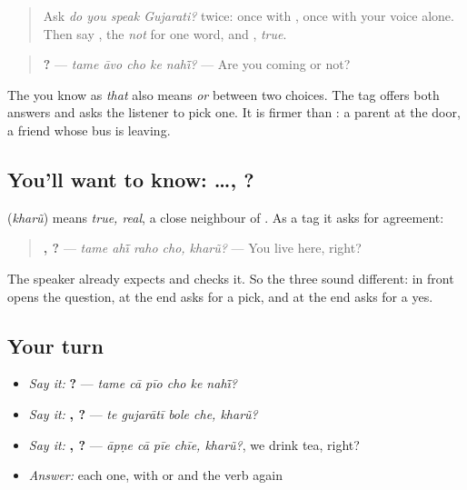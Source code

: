 \begin{quote}
Ask \emph{do you speak Gujarati?} twice: once with \textbf{}, once with your voice alone. Then say \textbf{}, the \emph{not} for one word, and \textbf{}, \emph{true}.
\end{quote}

\begin{grammarlens}[title={Grammar Lens: … \gu{કે} \gu{નહીં}?}]
\begin{quote}
\textbf{    ?} — \emph{tame āvo cho ke nahī̃?} — Are you coming or not?
\end{quote}

The \textbf{} you know as \emph{that} also means \emph{or} between two choices. The tag offers both answers and asks the listener to pick one. It is firmer than \textbf{}: a parent at the door, a friend whose bus is leaving.
\end{grammarlens}

\subsection*{You'll want to know: …, ?}
\textbf{} (\emph{kharũ}) means \emph{true, real}, a close neighbour of \textbf{}. As a tag it asks for agreement:

\begin{quote}
\textbf{   , ?} — \emph{tame ahī̃ raho cho, kharũ?} — You live here, right?
\end{quote}

The speaker already expects \textbf{} and checks it. So the three sound different: \textbf{} in front opens the question, \textbf{ } at the end asks for a pick, and \textbf{} at the end asks for a yes.

\subsection*{Your turn}
\begin{itemize}
\raggedright
  \item \emph{Say it:} \textbf{     ?} — \emph{tame cā pīo cho ke nahī̃?}
  \item \emph{Say it:} \textbf{   , ?} — \emph{te gujarātī bole che, kharũ?}
  \item \emph{Say it:} \textbf{   , ?} — \emph{āpṇe cā pīe chīe, kharũ?}, we drink tea, right?
  \item \emph{Answer:} each one, with \textbf{} or \textbf{} and the verb again
\end{itemize}

